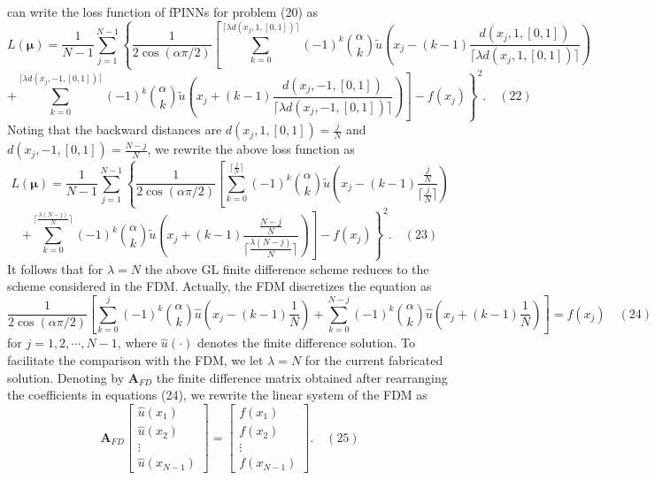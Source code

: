 \documentclass[UTF8]{article}
\begin{document}
can write the loss function of fPINNs for problem (20) as
$$
L(\boldsymbol{\mu}) = \frac{1}{N-1} \sum_{j=1}^{N-1} \left\{ \frac{1}{2\cos(\alpha\pi/2)} \left[ \sum_{k=0}^{\lceil \lambda d(x_j, 1, [0, 1]) \rceil} (-1)^k \binom{\alpha}{k} \tilde{u} \left( x_j - (k-1) \frac{d(x_j, 1, [0, 1])}{\lceil \lambda d(x_j, 1, [0, 1]) \rceil} \right) \right. \right.
$$
$$
\left. \left. + \sum_{k=0}^{\lceil \lambda d(x_j, -1, [0, 1]) \rceil} (-1)^k \binom{\alpha}{k} \tilde{u} \left( x_j + (k-1) \frac{d(x_j, -1, [0, 1])}{\lceil \lambda d(x_j, -1, [0, 1]) \rceil} \right) \right] - f(x_j) \right\}^2. \quad (22)
$$
Noting that the backward distances are $d(x_j, 1, [0, 1]) = \frac{j}{N}$ and $d(x_j, -1, [0, 1]) = \frac{N-j}{N}$, we rewrite the above loss function as
$$
L(\boldsymbol{\mu}) = \frac{1}{N-1} \sum_{j=1}^{N-1} \left\{ \frac{1}{2\cos(\alpha\pi/2)} \left[ \sum_{k=0}^{\lceil \frac{j}{N} \rceil} (-1)^k \binom{\alpha}{k} \tilde{u} \left( x_j - (k-1) \frac{\frac{j}{N}}{\lceil \frac{j}{N} \rceil} \right) \right. \right.
$$
$$
\left. \left. + \sum_{k=0}^{\lceil \frac{\lambda(N-j)}{N} \rceil} (-1)^k \binom{\alpha}{k} \tilde{u} \left( x_j + (k-1) \frac{\frac{N-j}{N}}{\lceil \frac{\lambda(N-j)}{N} \rceil} \right) \right] - f(x_j) \right\}^2. \quad (23)
$$
It follows that for $\lambda = N$ the above GL finite difference scheme reduces to the scheme considered in the FDM. Actually, the FDM discretizes the equation as
$$
\frac{1}{2\cos(\alpha\pi/2)} \left[ \sum_{k=0}^{j} (-1)^k \binom{\alpha}{k} \hat{u} \left( x_j - (k-1) \frac{1}{N} \right) + \sum_{k=0}^{N-j} (-1)^k \binom{\alpha}{k} \hat{u} \left( x_j + (k-1) \frac{1}{N} \right) \right] = f(x_j) \quad (24)
$$
for $j = 1, 2, \cdots, N-1$, where $\hat{u}(\cdot)$ denotes the finite difference solution. To facilitate the comparison with the FDM, we let $\lambda = N$ for the current fabricated solution. Denoting by $\mathbf{A}_{FD}$ the finite difference matrix obtained after rearranging the coefficients in equations (24), we rewrite the linear system of the FDM as
$$
\mathbf{A}_{FD} \left[ \begin{array}{c} \hat{u}(x_1) \\ \hat{u}(x_2) \\ \vdots \\ \hat{u}(x_{N-1}) \end{array} \right] = \left[ \begin{array}{c} f(x_1) \\ f(x_2) \\ \vdots \\ f(x_{N-1}) \end{array} \right]. \quad (25)
$$
\end{document}
